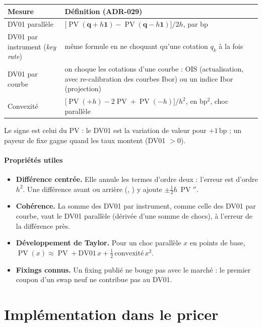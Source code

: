 \documentclass[11pt,a4paper]{article}
\newcommand{\code}[1]{\texttt{\detokenize{#1}}}
\newcommand{\bp}{\,\mathrm{bp}}
\DeclareMathOperator{\PV}{PV}
\theoremstyle{plain}
\theoremstyle{definition}
\theoremstyle{remark}
\begin{document}
\begin{center}
\begin{tabularx}{\linewidth}{@{}lX@{}}
\toprule
Mesure & Définition (ADR-029) \\
\midrule
DV01 parallèle & \(\bigl[\PV(\mathbf q+h\mathbf 1) - \PV(\mathbf q-h\mathbf 1)\bigr]/2h\), par bp \\
DV01 par instrument (\emph{key rate}) & même formule en ne choquant qu'une cotation \(q_k\) à la fois \\
DV01 par courbe & on choque les cotations d'une courbe : OIS (actualisation, avec re-calibration des
courbes Ibor) ou un indice Ibor (projection) \\
Convexité & \(\bigl[\PV(+h) - 2\PV + \PV(-h)\bigr]/h^2\), en bp\(^2\), choc parallèle \\
\bottomrule
\end{tabularx}
\end{center}
Le signe est celui du PV : le DV01 est la variation de valeur pour \(+1\bp\) ; un payeur de fixe gagne
quand les taux montent (DV01 \(>0\)).

\subsection{Propriétés utiles}
\begin{itemize}
  \item \textbf{Différence centrée.} Elle annule les termes d'ordre deux : l'erreur est d'ordre
    \(h^2\). Une différence avant ou arrière (\code{up}, \code{down}) y ajoute \(\pm\tfrac12 h\,\PV''\).
  \item \textbf{Cohérence.} La somme des DV01 par instrument, comme celle des DV01 par courbe, vaut le
    DV01 parallèle (dérivée d'une somme de chocs), à l'erreur de la différence près.
  \item \textbf{Développement de Taylor.} Pour un choc parallèle \(x\) en points de base,
    \(\PV(x)\approx \PV + \mathrm{DV01}\,x + \tfrac12\,\mathrm{convexité}\,x^2\).
  \item \textbf{Fixings connus.} Un fixing publié ne bouge pas avec le marché : le premier coupon d'un
    swap neuf ne contribue pas au DV01.
\end{itemize}

\part{Implémentation dans le pricer}
\end{document}
